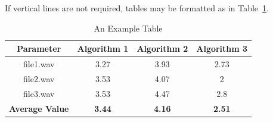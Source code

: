 \indent If vertical lines are not required, tables may be formatted as in Table~\ref{tab:Table_novert}.
\begin{table}[h]
	\renewcommand{\arraystretch}{1.1}
	\caption{An Example Table}
	\label{tab:Table_novert}
	\centering
	\begin{tabular}{cccc}
		\hline
		Parameter 		& Algorithm 1 	&  	Algorithm 2 	& 	Algorithm 3	\\
		\hline

		file1.wav 		& 3.27		&	3.93		&	2.73 		\\
		file2.wav 		& 3.53		&	4.07		&	2		\\
		file3.wav 		& 3.53		&	4.47		&	2.8 		\\ \hline

		\hline 
		\textbf{Average Value}	& \textbf{3.44} &  \textbf{4.16} & \textbf{2.51}\\ \hline
	\end{tabular}
\end{table}


